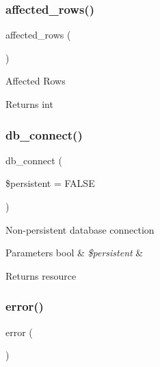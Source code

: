 \subsubsection{\texorpdfstring{affected\+\_\+rows()}{affected\_rows()}}
{\footnotesize\ttfamily affected\+\_\+rows (\begin{DoxyParamCaption}{ }\end{DoxyParamCaption})}

Affected Rows

\begin{DoxyReturn}{Returns}
int 
\end{DoxyReturn}
\mbox{\label{class_c_i___d_b__cubrid__driver_a52bf595e79e96cc0a7c907a9b45aeb4d}} 
\subsubsection{\texorpdfstring{db\+\_\+connect()}{db\_connect()}}
{\footnotesize\ttfamily db\+\_\+connect (\begin{DoxyParamCaption}\item[{}]{\$persistent = {\ttfamily FALSE} }\end{DoxyParamCaption})}

Non-\/persistent database connection


\begin{DoxyParams}[1]{Parameters}
bool & {\em \$persistent} & \\
\hline
\end{DoxyParams}
\begin{DoxyReturn}{Returns}
resource 
\end{DoxyReturn}
\mbox{\label{class_c_i___d_b__cubrid__driver_a43b8d30b879d4f09ceb059b02af2bc02}} 
\subsubsection{\texorpdfstring{error()}{error()}}
{\footnotesize\ttfamily error (\begin{DoxyParamCaption}{ }\end{DoxyParamCaption})}

